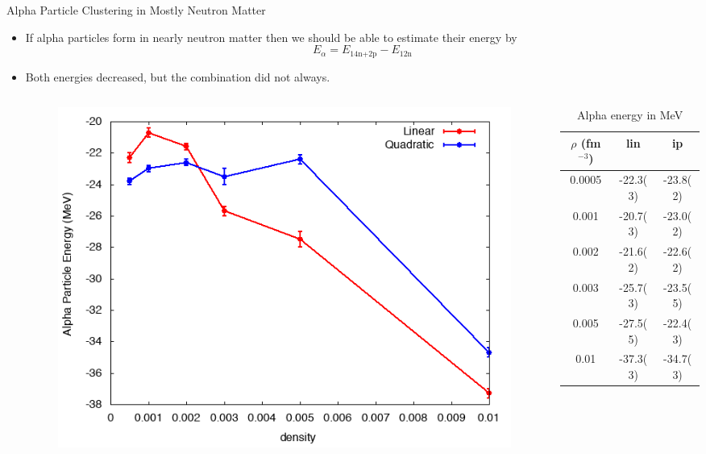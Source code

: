 \documentclass{beamer}
\begin{document}
\begin{frame}{\large Alpha Particle Clustering in Mostly Neutron Matter}
\begin{itemize}
   \item If alpha particles form in nearly neutron matter then we should be able to estimate their energy by
   \begin{equation*}
      E_\alpha = E_\text{14n+2p} - E_\text{12n}
   \end{equation*}
   \item Both energies decreased, but the combination did not always.
   \vspace{-0.25cm}
   \begin{columns}
   \begin{column}{0.5\textwidth}
   \begin{figure}[h]
      \centering
      \includegraphics[width=\textwidth]{figures/clusterplot.png}
   \end{figure}
   \end{column}
   \begin{column}{0.5\textwidth}
   \begin{table}[h!]
      \centering
      \caption{Alpha energy in MeV}
      \begin{tabular}{ccc}
         \hline \hline
         $\rho$ (fm$^{-3}$) & lin & ip \\
         \hline
         0.0005& -22.3(3)  & -23.8(2)  \\
         0.001 & -20.7(3)  & -23.0(2)  \\
         0.002 & -21.6(2)  & -22.6(2)  \\
         0.003 & -25.7(3)  & -23.5(5)  \\
         0.005 & -27.5(5)  & -22.4(3)  \\
         0.01  & -37.3(3)  & -34.7(3)  \\
         \hline \hline
      \end{tabular}
   \end{table}
   \end{column}
   \end{columns}
\end{itemize}
\end{frame}
\end{document}
